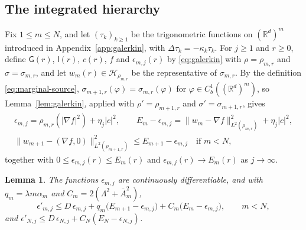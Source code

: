 \documentclass[11pt]{amsart}
\numberwithin{equation}{section}
\theoremstyle{plain}
\newtheorem{lemma}[theorem]{Lemma}
\theoremstyle{remark}
\newcommand{\R}{\mathbb{R}}
\newcommand{\cH}{\mathcal{H}}
\begin{document}
\subsection{The integrated hierarchy}
Fix $1\le m\le N$, and let $(\tau_k)_{k\ge1}$ be the trigonometric functions on $(\R^d)^m$ introduced in Appendix~\ref{app:galerkin}, with $\Delta\tau_k=-\kappa_k\tau_k$. For $j\ge1$ and $r\ge0$, define $\mathsf G(r)$, $\mathsf l(r)$, $c(r)$, $f$ and $\epsilon_{m,j}(r)$ by \eqref{eq:galerkin} with $\rho=\rho_{m,r}$ and $\sigma=\sigma_{m,r}$, and let $w_m(r)\in\cH_{\rho_{m,r}}$ be the representative of $\sigma_{m,r}$. By the definition \eqref{eq:marginal-source}, $\sigma_{m+1,r}(\varphi)=\sigma_{m,r}(\varphi)$ for $\varphi\in C^1_b((\R^d)^m)$, so Lemma~\ref{lem:galerkin}, applied with $\rho'=\rho_{m+1,r}$ and $\sigma'=\sigma_{m+1,r}$, gives
\begin{gather}
\epsilon_{m,j}=\rho_{m,r}(|\nabla f|^2)+\eta_j|c|^2,\qquad E_m-\epsilon_{m,j}=\|w_m-\nabla f\|^2_{L^2(\rho_{m,r})}+\eta_j|c|^2,\label{eq:gal1}\\
\|w_{m+1}-(\nabla f,0)\|^2_{L^2(\rho_{m+1,r})}\le E_{m+1}-\epsilon_{m,j}\quad\text{if }m<N,\label{eq:gal2}
\end{gather}
together with $0\le\epsilon_{m,j}(r)\le E_m(r)$ and $\epsilon_{m,j}(r)\to E_m(r)$ as $j\to\infty$.

\begin{lemma}\label{lem:gal-ode}
The functions $\epsilon_{m,j}$ are continuously differentiable, and with $q_m=\lambda m\alpha_m$ and $C_m=2(\Lambda^2+\bar A_m^2)$,
\begin{equation}\label{eq:gal-ode}
\epsilon'_{m,j}\le D\,\epsilon_{m,j}+q_m\big(E_{m+1}-\epsilon_{m,j}\big)+C_m\big(E_m-\epsilon_{m,j}\big),\qquad m<N,
\end{equation}
and $\epsilon'_{N,j}\le D\,\epsilon_{N,j}+C_N(E_N-\epsilon_{N,j})$.
\end{lemma}
\end{document}
